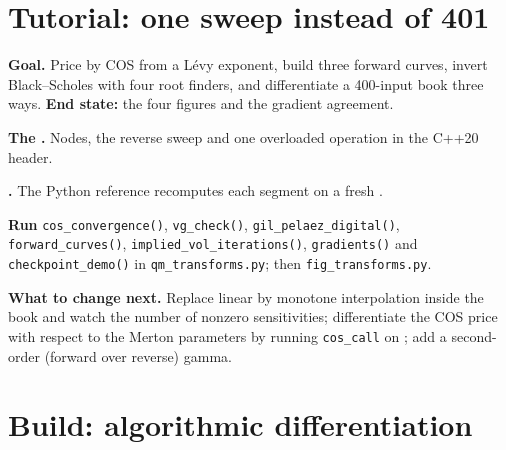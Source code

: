 \section{Tutorial: one sweep instead of 401}\label{tut:qm:transforms-interpolation-and-algorithmic-differentiation:aad}

\begin{tutorial}
\textbf{Goal.} Price by COS from a Lévy exponent, build three forward curves, invert Black--Scholes with four root finders, and differentiate a 400-input book three ways. \textbf{End state:} the four figures
and the gradient agreement.
\begin{tutsteps}
\item \textbf{The .} Nodes, the reverse sweep and one overloaded operation in the C++20 header.
\item \textbf{.} The Python reference recomputes each segment on a fresh .
\item \textbf{Run} \texttt{cos\_convergence()}, \texttt{vg\_check()}, \texttt{gil\_pelaez\_digital()}, \texttt{forward\_curves()}, \texttt{implied\_vol\_iterations()}, \texttt{gradients()} and
\texttt{checkpoint\_demo()} in \texttt{qm\_transforms.py}; then \texttt{fig\_transforms.py}.
\end{tutsteps}
\textbf{What to change next.} Replace linear by monotone interpolation inside the book and watch the number of nonzero sensitivities; differentiate the COS price with respect to the Merton parameters by
running \texttt{cos\_call} on ; add a second-order (forward over reverse) gamma.
\end{tutorial}

\section{Build: algorithmic differentiation}\label{bld:qm:transforms-interpolation-and-algorithmic-differentiation:aad}

